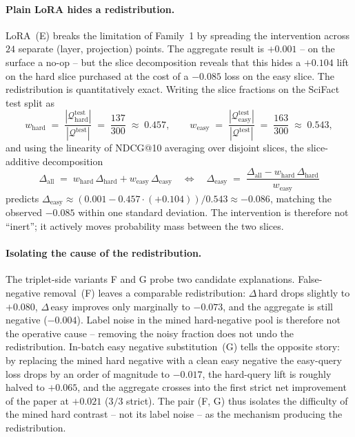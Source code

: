 \paragraph{Plain LoRA hides a redistribution.}
LoRA~(E) breaks the limitation of Family~1 by spreading the intervention across $24$ separate (layer, projection) points. The aggregate result is $+0.001$ -- on the surface a no-op -- but the slice decomposition reveals that this hides a $+0.104$ lift on the hard slice purchased at the cost of a $-0.085$ loss on the easy slice. The redistribution is quantitatively exact. Writing the slice fractions on the SciFact test split as
\begin{equation}
w_{\text{hard}} \;=\; \frac{|\mathcal{Q}_{\text{hard}}^{\text{test}}|}{|\mathcal{Q}^{\text{test}}|} \;=\; \frac{137}{300} \;\approx\; 0.457,
\qquad
w_{\text{easy}} \;=\; \frac{|\mathcal{Q}_{\text{easy}}^{\text{test}}|}{|\mathcal{Q}^{\text{test}}|} \;=\; \frac{163}{300} \;\approx\; 0.543,
\label{eq:slice-weights}
\end{equation}
and using the linearity of NDCG@10 averaging over disjoint slices, the slice-additive decomposition
\begin{equation}
\Delta_{\text{all}} \;=\; w_{\text{hard}}\,\Delta_{\text{hard}} + w_{\text{easy}}\,\Delta_{\text{easy}}
\quad\Longleftrightarrow\quad
\Delta_{\text{easy}} \;=\; \frac{\Delta_{\text{all}} - w_{\text{hard}}\,\Delta_{\text{hard}}}{w_{\text{easy}}}
\label{eq:redistribution}
\end{equation}
predicts $\Delta_{\text{easy}} \approx (0.001 - 0.457 \cdot (+0.104))/0.543 \approx -0.086$, matching the observed $-0.085$ within one standard deviation. The intervention is therefore not ``inert''; it actively moves probability mass between the two slices.

\paragraph{Isolating the cause of the redistribution.}
The triplet-side variants F and G probe two candidate explanations. False-negative removal~(F) leaves a comparable redistribution: $\Delta$\,hard drops slightly to $+0.080$, $\Delta$\,easy improves only marginally to $-0.073$, and the aggregate is still negative ($-0.004$). Label noise in the mined hard-negative pool is therefore not the operative cause -- removing the noisy fraction does not undo the redistribution. In-batch easy negative substitution~(G) tells the opposite story: by replacing the mined hard negative with a clean easy negative the easy-query loss drops by an order of magnitude to $-0.017$, the hard-query lift is roughly halved to $+0.065$, and the aggregate crosses into the first strict net improvement of the paper at $+0.021$ ($3/3$ strict). The pair (F, G) thus isolates the difficulty of the mined hard contrast -- not its label noise -- as the mechanism producing the redistribution.

